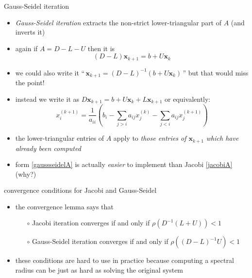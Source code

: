 \documentclass[10pt,hyperref]{beamer}
\newcommand{\bx}{\mathbf{x}}
\begin{document}
\begin{frame}{Gauss-Seidel iteration}

\begin{itemize}
\item \emph{Gauss-Seidel iteration} extracts the non-strict lower-triangular part of $A$ (and inverts it)
\item again if $A = D - L - U$ then it is
\begin{equation}
(D - L) \bx_{k+1} = b + U \bx_k  \label{gaussseidel}
\end{equation}
\item we could also write it \quad ``\,$\bx_{k+1} = (D-L)^{-1} \left(b + U \bx_k\right)$\,'' \quad but that would miss the point!
\item instead we write it as \quad $D \bx_{k+1} = b + U \bx_k + L \bx_{k+1}$ \quad or equivalently:
\begin{equation}
x_i^{(k+1)} = \frac{1}{a_{ii}} \left(b_i - \sum_{j > i} a_{ij} x_j^{(k)} - \sum_{j < i} a_{ij} x_j^{(k+1)}\right)  \label{gaussseidelA}
\end{equation}
\item the lower-triangular entries of $A$ apply to \emph{those entries of $\bx_{k+1}$ which have already been computed}
\item form \eqref{gaussseidelA} is actually \emph{easier} to implement than Jacobi \eqref{jacobiA}  \quad (why?)
\end{itemize}
\end{frame}


\begin{frame}{convergence conditions for Jacobi and Gauss-Seidel}

\begin{itemize}
\item the convergence lemma says that
  \begin{itemize}
  \item[$\circ$] Jacobi iteration converges if and only if $\rho(D^{-1} (L+U)) < 1$
  \item[$\circ$] Gauss-Seidel iteration converges if and only if $\rho((D-L)^{-1} U) < 1$
  \end{itemize}
\item these conditions are hard to use in practice because computing a spectral radius can be just as hard as solving the original system
\end{itemize}
\end{frame}
\end{document}
